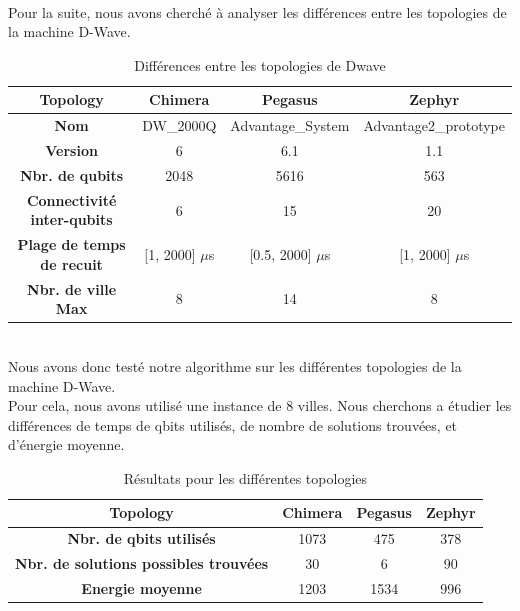 \documentclass{article}
\begin{document}
        \\
        Pour la suite, nous avons cherché à analyser les différences entre les topologies de la machine D-Wave.\\
        \begin{table}[h]
            \centering
            \begin{tabular}{|c|c|c|c|}
                \hline
                \textbf{Topology} & Chimera & Pegasus & Zephyr \\ \hline
                \textbf{Nom} & DW\_2000Q & Advantage\_System & Advantage2\_prototype \\ \hline
                \textbf{Version} & 6 & 6.1 & 1.1 \\ \hline
                \textbf{Nbr. de qubits} & 2048 & 5616 & 563 \\ \hline
                \textbf{Connectivité inter-qubits} & 6 & 15 & 20 \\ \hline
                \textbf{Plage de temps de recuit} & [1, 2000] $\mu$s & [0.5, 2000] $\mu$s & [1, 2000] $\mu$s\\ \hline
                \textbf{Nbr. de ville Max} & 8 & 14 & 8 \\ \hline

            \end{tabular}
            \caption{Différences entre les topologies de Dwave}
            \label{tab:topologies}
        \end{table}\\
        Nous avons donc testé notre algorithme sur les différentes topologies de la machine D-Wave.\\
        Pour cela, nous avons utilisé une instance de 8 villes. Nous cherchons a étudier les différences de temps de qbits utilisés, de nombre de solutions trouvées, et d'énergie moyenne.\\
        \begin{table}[h]
            \centering
            \begin{tabular}{|c|c|c|c|}
                \hline
                \textbf{Topology} & Chimera & Pegasus & Zephyr \\ \hline
                \textbf{Nbr. de qbits utilisés} & 1073 & 475 & 378 \\ \hline
                \textbf{Nbr. de solutions possibles trouvées} & 30 & 6 & 90 \\ \hline
                \textbf{Energie moyenne} & 1203 & 1534 & 996 \\ \hline
            \end{tabular}
            \caption{Résultats pour les différentes topologies}
            \label{tab:topologies_results}
        \end{table}\\
\end{document}
